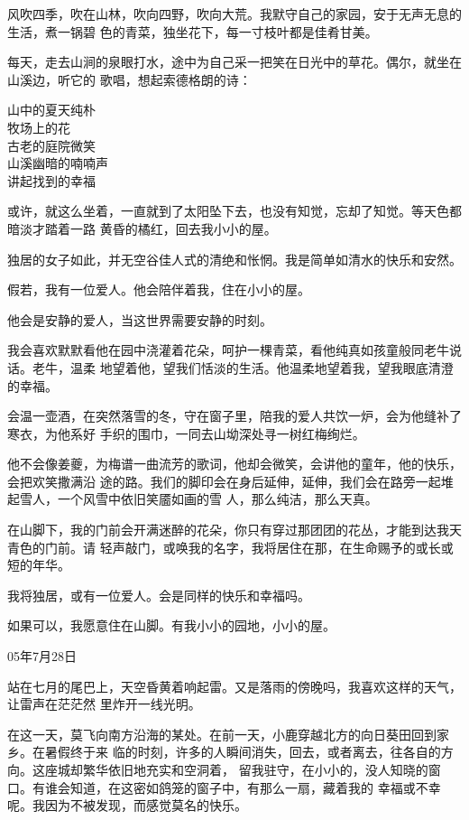 \documentclass[12pt,a4paper]{article}
\begin{document}
		风吹四季，吹在山林，吹向四野，吹向大荒。我默守自己的家园，安于无声无息的生活，煮一锅碧
	色的青菜，独坐花下，每一寸枝叶都是佳肴甘美。

		每天，走去山涧的泉眼打水，途中为自己采一把笑在日光中的草花。偶尔，就坐在山溪边，听它的
	歌唱，想起索德格朗的诗：

		\longpoem{}{}{}
		山中的夏天纯朴 \\
		牧场上的花 \\
		古老的庭院微笑 \\
		山溪幽暗的喃喃声 \\
		讲起找到的幸福
		\endlongpoem

		或许，就这么坐着，一直就到了太阳坠下去，也没有知觉，忘却了知觉。等天色都暗淡才踏着一路
	黄昏的橘红，回去我小小的屋。

		独居的女子如此，并无空谷佳人式的清绝和怅惘。我是简单如清水的快乐和安然。

		假若，我有一位爱人。他会陪伴着我，住在小小的屋。\par
		他会是安静的爱人，当这世界需要安静的时刻。

		我会喜欢默默看他在园中浇灌着花朵，呵护一棵青菜，看他纯真如孩童般同老牛说话。老牛，温柔
	地望着他，望我们恬淡的生活。他温柔地望着我，望我眼底清澄的幸福。

		会温一壶酒，在突然落雪的冬，守在窗子里，陪我的爱人共饮一炉，会为他缝补了寒衣，为他系好
	手织的围巾，一同去山坳深处寻一树红梅绚烂。

		他不会像姜夔，为梅谱一曲流芳的歌词，他却会微笑，会讲他的童年，他的快乐，会把欢笑撒满沿
	途的路。我们的脚印会在身后延伸，延伸，我们会在路旁一起堆起雪人，一个风雪中依旧笑靥如画的雪
	人，那么纯洁，那么天真。

		在山脚下，我的门前会开满迷醉的花朵，你只有穿过那团团的花丛，才能到达我天青色的门前。请
	轻声敲门，或唤我的名字，我将居住在那，在生命赐予的或长或短的年华。

		我将独居，或有一位爱人。会是同样的快乐和幸福吗。

		如果可以，我愿意住在山脚。有我小小的园地，小小的屋。

		\begin{flushright}
			05年7月28日
		\end{flushright}

	\endwriting



		站在七月的尾巴上，天空昏黄着响起雷。又是落雨的傍晚吗，我喜欢这样的天气，让雷声在茫茫然
	里炸开一线光明。

		在这一天，莫飞向南方沿海的某处。在前一天，小鹿穿越北方的向日葵田回到家乡。在暑假终于来
	临的时刻，许多的人瞬间消失，回去，或者离去，往各自的方向。这座城却繁华依旧地充实和空洞着，
	留我驻守，在小小的，没人知晓的窗口。有谁会知道，在这密如鸽笼的窗子中，有那么一扇，藏着我的
	幸福或不幸呢。我因为不被发现，而感觉莫名的快乐。
\end{document}
